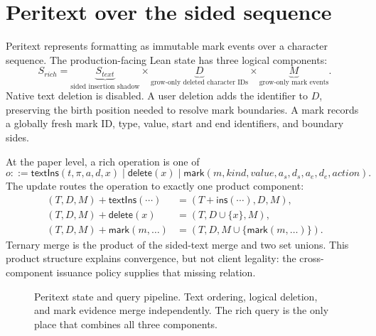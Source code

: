 \section{Peritext over the sided sequence}

Peritext represents formatting as immutable mark events over a character
sequence. The production-facing Lean state has three logical components:
\[
  S_{\mathit{rich}}=
  \underbrace{S_{\mathit{text}}}_{\text{sided insertion shadow}}
  \times
  \underbrace{D}_{\text{grow-only deleted character IDs}}
  \times
  \underbrace{M}_{\text{grow-only mark events}}.
\]
Native text deletion is disabled. A user deletion adds the identifier to
$D$, preserving the birth position needed to resolve mark boundaries. A mark
records a globally fresh mark ID, type, value, start and end identifiers, and
boundary sides.

At the paper level, a rich operation is one of
\[
 o ::= \mathsf{textIns}(t,\pi,a,d,x)
   \mid \mathsf{delete}(x)
   \mid \mathsf{mark}(m,\mathit{kind},\mathit{value},
                      a_s,d_s,a_e,d_e,\mathit{action}).
\]
The update routes the operation to exactly one product component:
\begin{align*}
 (T,D,M)\mathbin{+}\mathsf{textIns}(\cdots)&=(T+\mathsf{ins}(\cdots),D,M),\\
 (T,D,M)\mathbin{+}\mathsf{delete}(x)&=(T,D\cup\{x\},M),\\
 (T,D,M)\mathbin{+}\mathsf{mark}(m,\ldots)&=(T,D,M\cup\{\mathsf{mark}(m,\ldots)\}).
\end{align*}
Ternary merge is the product of the sided-text merge and two set unions.
This product structure explains convergence, but not client legality: the
cross-component issuance policy supplies that missing relation.

\begin{figure}[H]
\centering
{}
\caption{Peritext state and query pipeline. Text ordering, logical deletion,
and mark evidence merge independently. The rich query is the only place that
combines all three components.}
\label{fig:peritext-pipeline}
\end{figure}

